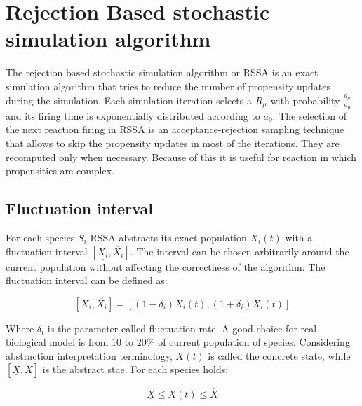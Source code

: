\section{Rejection Based stochastic simulation algorithm}
The rejection based stochastic simulation algorithm or RSSA is an exact simulation algorithm that tries to reduce the number of propensity updates during the simulation.
Each simulation iteration selects a $R_\mu$ with probability $\frac{a_\mu}{a_0}$ and its firing time is exponentially distributed according to $a_0$.
The selection of the next reaction firing in RSSA is an acceptance-rejection sampling technique that allows to skip the propensity updates in most of the iterations.
They are recomputed only when necessary.
Because of this it is useful for reaction in which propensities are complex.

  \subsection{Fluctuation interval}
  For each species $S_i$ RSSA abstracts its exact population $X_i(t)$ with a fluctuation interval $[\underline{X_i}, \overline{X_i}]$.
  The interval can be chosen arbitrarily around the current population without affecting the correctness of the algorithm.
  The fluctuation interval can be defined as:

  $$[\underline{X_i}, \overline{X_i}] = [(1-\delta_i)X_i(t), (1+\delta_i)X_i(t)]$$

  Where $\delta_i$ is the parameter called fluctuation rate.
  A good choice for real biological model is from $10$ to $20\%$ of current population of species.
  Considering abstraction interpretation terminology, $X(t)$ is called the concrete state, while $[\underline{X},\overline{X}]$ is the abstract stae.
  For each species holds:

  $$\underline{X}\le X(t)\le \overline{X}$$








































